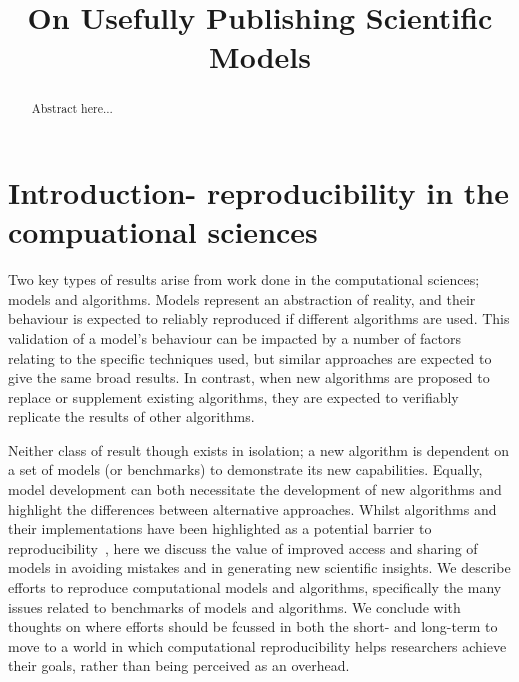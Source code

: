 \documentclass[conference]{IEEEtran}
\begin{document}

\title{On Usefully Publishing Scientific Models} 

\author{
\and
{}
}

\maketitle

\begin{abstract}
Abstract here...
\end{abstract}

\IEEEpeerreviewmaketitle

\section{Introduction- reproducibility in the compuational sciences}
Two key types of results arise from work done in the computational sciences; models 
and algorithms. Models represent an abstraction of reality, and their behaviour is
expected to reliably reproduced if different algorithms are used. This validation
of a model's behaviour can be impacted by a number of factors relating to the specific
techniques used, but similar approaches are expected to give the same broad results. 
In contrast, when new algorithms are proposed to replace or supplement existing 
algorithms, they are expected to verifiably replicate the results of other algorithms.

Neither class of result though exists in isolation; a new algorithm is dependent on 
a set of models (or benchmarks) to demonstrate its new capabilities. Equally, model 
development can both necessitate the development of new algorithms and highlight the 
differences between alternative approaches. Whilst algorithms and their implementations
have been highlighted as a potential barrier to reproducibility~\cite{crick-et-al_wssspe2},
here we discuss the value of improved access and sharing of models in avoiding mistakes
and in generating new scientific insights. We describe efforts to reproduce computational 
models and algorithms, specifically the many issues related to benchmarks of models and 
algorithms. We conclude with thoughts on where efforts should be fcussed in both the short- 
and long-term to move to a world in which computational reproducibility helps researchers 
achieve their goals, rather than being perceived as an overhead.
\end{document}
